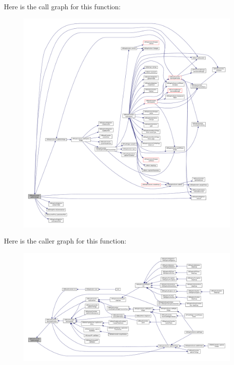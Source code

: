 Here is the call graph for this function\-:
\nopagebreak
\begin{figure}[H]
\begin{center}
\leavevmode
\includegraphics[width=350pt]{d7/d62/class_u_b_board_controller_af8867753146efd8498f1a308e0457c9e_cgraph}
\end{center}
\end{figure}




Here is the caller graph for this function\-:
\nopagebreak
\begin{figure}[H]
\begin{center}
\leavevmode
\includegraphics[width=350pt]{d7/d62/class_u_b_board_controller_af8867753146efd8498f1a308e0457c9e_icgraph}
\end{center}
\end{figure}


